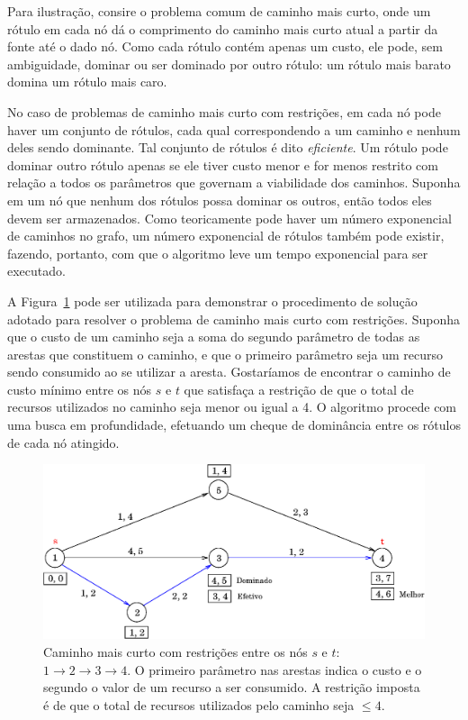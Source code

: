 Para ilustração, consire o problema comum de caminho mais curto, onde um rótulo em cada nó dá o 
comprimento do caminho mais curto atual a partir da fonte até o dado nó. Como cada rótulo contém
apenas um custo, ele pode, sem ambiguidade, dominar ou ser dominado por outro rótulo: um rótulo mais
barato domina um rótulo mais caro.

No caso de problemas de caminho mais curto com restrições, em cada nó pode haver um conjunto de 
rótulos, cada qual correspondendo a um caminho e nenhum deles sendo dominante. Tal conjunto de 
rótulos é dito {\it eficiente}. Um rótulo pode dominar outro rótulo apenas se ele tiver custo
menor e for menos restrito com relação a todos os parâmetros que governam a viabilidade dos 
caminhos. Suponha em um nó que nenhum dos rótulos possa dominar os outros, então todos eles devem 
ser armazenados. Como teoricamente pode haver um número exponencial de caminhos no grafo, um número
exponencial de rótulos também pode existir, fazendo, portanto, com que o algoritmo leve um tempo
exponencial para ser executado.

A Figura~\ref{fig:shortest_path} pode ser utilizada para demonstrar o procedimento de solução
adotado para resolver o problema de caminho mais curto com restrições. Suponha que o custo de um
caminho seja a soma do segundo parâmetro de todas as arestas que constituem o caminho, e que o
primeiro parâmetro seja um recurso sendo consumido ao se utilizar a aresta. Gostaríamos de encontrar
o caminho de custo mínimo entre os nós $s$ e $t$ que satisfaça a restrição de que o total de
recursos utilizados no caminho seja menor ou igual a 4. O algoritmo procede com uma busca em 
profundidade, efetuando um cheque de dominância entre os rótulos de cada nó atingido.

\begin{figure}[htbp]
	\begin{center}
		\includegraphics[scale=0.6]{fig/shortest_path.eps}
		\caption{Caminho mais curto com restrições entre os nós $s$ e $t$: $1 \to 2 \to 3 \to 4$.
		O primeiro parâmetro nas arestas indica o custo e o segundo o valor de um recurso a ser
    consumido. A restrição imposta é de que o total de recursos utilizados pelo caminho seja 
		$\leq 4$.}
		\label{fig:shortest_path}
	\end{center}
\end{figure}